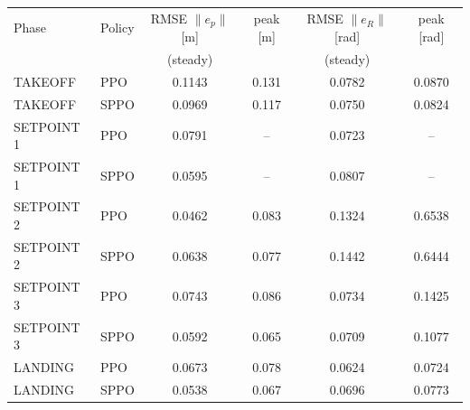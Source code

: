\begin{tabular}{llcccc}
\toprule
Phase & Policy & RMSE $\|e_p\|$ [m] & peak [m] & RMSE $\|e_R\|$ [rad] & peak [rad] \\
 & & (steady) & & (steady) & \\
\midrule
TAKEOFF & PPO & 0.1143 & 0.131 & 0.0782 & 0.0870 \\
TAKEOFF & SPPO & 0.0969 & 0.117 & 0.0750 & 0.0824 \\
\midrule
SETPOINT 1 & PPO & 0.0791 & -- & 0.0723 & -- \\
SETPOINT 1 & SPPO & 0.0595 & -- & 0.0807 & -- \\
\midrule
SETPOINT 2 & PPO & 0.0462 & 0.083 & 0.1324 & 0.6538 \\
SETPOINT 2 & SPPO & 0.0638 & 0.077 & 0.1442 & 0.6444 \\
\midrule
SETPOINT 3 & PPO & 0.0743 & 0.086 & 0.0734 & 0.1425 \\
SETPOINT 3 & SPPO & 0.0592 & 0.065 & 0.0709 & 0.1077 \\
\midrule
LANDING & PPO & 0.0673 & 0.078 & 0.0624 & 0.0724 \\
LANDING & SPPO & 0.0538 & 0.067 & 0.0696 & 0.0773 \\
\bottomrule
\end{tabular}
